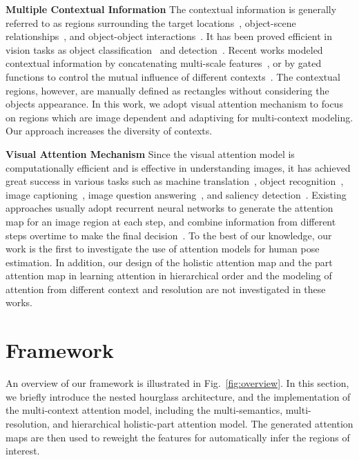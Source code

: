 \documentclass[10pt,twocolumn,letterpaper]{article}
\newcommand{\smalltitle}[1]{\vspace{0.2em}\noindent \textbf{{#1}}}
\begin{document}
\smalltitle{Multiple Contextual Information} 
The contextual information is generally referred to as regions surrounding the target locations~\cite{histogramsINRIA,fan2015combining,ramakrishna2014pose}, object-scene relationships~\cite{heitz2008learning, gupta2008context,divvala2009empirical}, and object-object interactions~\cite{yang2012recognizing}. It has been proved efficient in vision tasks as object classification~\cite{krizhevsky2012imagenet} and detection~\cite{Zeng2013Multi,histogramsINRIA,divvala2009empirical}. 
Recent works modeled contextual information by concatenating multi-scale features~\cite{girshick2014deformable,gidaris2015object}, or by gated functions to control the mutual influence of different contexts~\cite{xyzeng2016object}. 
The contextual regions, however, are manually defined as rectangles without considering the objects appearance. 
In this work, we adopt visual attention mechanism to focus on regions which are image dependent and adaptiving for multi-context modeling. Our approach increases the diversity of contexts.  




\smalltitle{Visual Attention Mechanism} 
Since the visual attention model is computationally efficient and is effective in understanding images, it has achieved great success in various tasks such as machine translation~\cite{bahdanau2014neural}, object recognition~\cite{ba2014multiple,gregor2015draw,cao2015look,xiao2015application}, image captioning~\cite{you2016image,xu2015show}, image question answering~\cite{yang2015stacked}, and saliency detection~\cite{kuen2016recurrent}. 
Existing approaches usually adopt recurrent neural networks to generate the attention map for an image region at each step, and combine information from different steps overtime to make the final decision~\cite{bahdanau2014neural, ba2014multiple,kuen2016recurrent}. 
To the best of our knowledge, our work is the first to investigate the use of attention models for human pose estimation. In addition, our design of the holistic attention map and the part attention map in learning attention in hierarchical order and the modeling of attention from different context and resolution are not investigated in these works.








\vspace{-1em}
\section{Framework}
\vspace{-0.5em}
An overview of our framework is illustrated in Fig.~\ref{fig:overview}. 
In this section, we briefly introduce the nested hourglass architecture, and the implementation of the multi-context attention model, including the multi-semantics, multi-resolution, and hierarchical holistic-part attention model. 
The generated attention maps are then used to reweight the features for automatically infer the regions of interest. 
\end{document}
